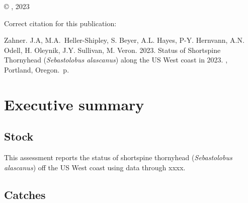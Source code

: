 \documentclass[11pt,
  english,
  letterpaper,
]{article}
\newcommand{\trTitle}{Status of Shortspine Thornyhead (\emph{Sebastolobus alascanus}) along the US West coast in 2023}
\newcommand{\trYear}{2023}
\newcommand{\trAuthsBack}{Zahner. J.A, M.A.~Heller-Shipley, S. Beyer, A.L. Hayes, P-Y. Hernvann, A.N. Odell, H. Oleynik, J.Y. Sullivan, M. Veron}
\newcommand{\trCitation}{
\begin{hangparas}{1em}{1}
\trAuthsBack{}. \trYear{}. \trTitle{}. \glsentrylong{pfmc}, Portland, Oregon. \pageref{LastPage}{}\,p.
\end{hangparas}}
\begin{document}
\thispagestyle{empty}
\vspace*{\fill}
\begin{center}
\copyright{} , \trYear{}\\
\end{center}
\par
\bigskip
\noindent
Correct citation for this publication:
\bigskip
\par
\trCitation{}
\clearpage


\tableofcontents\clearpage
\label{TRlastRoman}
\clearpage

\newpage
\thispagestyle{empty} %

\pagestyle{plain}  %
\renewcommand*{\thefootnote}{\arabic{footnote}}  %
\setcounter{footnote}{0}  %
\renewcommand{\headrulewidth}{0.5pt}
\renewcommand{\footrulewidth}{0.5pt}

\newcommand{\lt}{\ensuremath <}
\newcommand{\gt}{\ensuremath >}

\pagebreak
{}
\setcounter{page}{1}

\renewcommand{\thetable}{\roman{table}}
\renewcommand{\thefigure}{\roman{figure}}

\setlength\parskip{0.5em plus 0.1em minus 0.2em}

\hypertarget{executive-summary}{%
\section*{Executive summary}\label{executive-summary}}

\hypertarget{stock}{%
\subsection*{Stock}\label{stock}}

This assessment reports the status of shortspine thornyhead (\emph{Sebastolobus alascanus}) off the US West coast using data through xxxx.

\hypertarget{catches}{%
\subsection*{Catches}\label{catches}}
\end{document}
